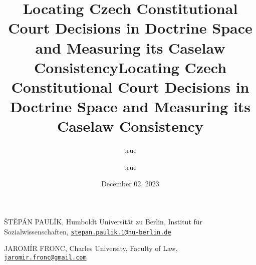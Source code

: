 \documentclass[
  11pt,
]{article}
\title{Locating Czech Constitutional Court Decisions in Doctrine Space
and Measuring its Caselaw Consistency}
\author{true \and true}
\date{December 02, 2023}
\title{Locating Czech Constitutional Court Decisions in Doctrine Space
and Measuring its Caselaw Consistency }
\date{}
\begin{document}



{%
\setlength{\parindent}{0pt}
\thispagestyle{plain}
{%
\maketitle  %

}




{
   \vskip 13.5pt\relax \normalsize\fontsize{11}{12}
   \MakeUppercase{Štěpán Paulík}, \small{Humboldt Universität zu Berlin,
Institut für Sozialwissenschaften,
\href{mailto:stepan.paulik.1@hu-berlin.de}{\nolinkurl{stepan.paulik.1@hu-berlin.de}}}   \par \vskip -3.5pt \MakeUppercase{Jaromír
Fronc}, \small{Charles University, Faculty of Law,
\href{mailto:jaromir.fronc@gmail.com}{\nolinkurl{jaromir.fronc@gmail.com}}}   

}

}
\end{document}

